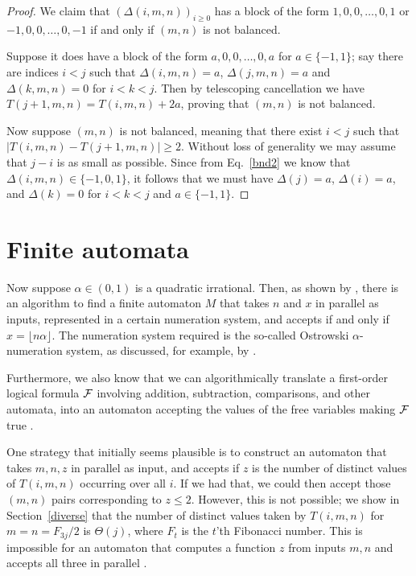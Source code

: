 \documentclass[final]{dmtcs-episciences}
\theoremstyle{plain}
\theoremstyle{remark}
\begin{document}
\begin{proof}
We claim that
$(\Delta(i,m,n))_{i \geq 0}$ has a block of the form $1,0,0,\ldots, 0,1$ or
$-1,0,0,\ldots,0, -1$ if and only if 
$(m,n)$ is not balanced.

Suppose it does have a block of the form $a,0,0,\ldots,0,a$ for $a \in \{ -1, 1\}$; say there are indices
$i < j$ such that
$\Delta(i,m,n) = a$,
$\Delta(j,m,n) = a$ and
$\Delta(k,m,n) = 0$ for $i<k<j$.
Then by telescoping cancellation
we have $T(j+1,m,n)= T(i,m,n) + 2a$, proving that $(m,n)$ is not balanced.

Now suppose $(m,n)$ is not balanced, meaning that there exist $i< j$
such that $|T(i,m,n) - T(j+1,m,n)| \geq 2$.  Without loss of generality we may assume that $j-i$ is as small as possible.
Since from Eq.~\eqref{bnd2} we know that $\Delta(i,m,n) \in \{-1,0,1\}$, it follows that we must have $\Delta(j) = a$,
$\Delta(i) = a$, and
$\Delta(k) = 0$ for $i < k < j$ and
$a \in \{-1,1\}$.
\end{proof}

\section{Finite automata}

Now suppose $\alpha \in (0,1)$ is a quadratic irrational.  Then, as shown by 
\cite{Schaeffer&Shallit&Zorcic:2024},
there is an algorithm to find a finite automaton $M$
that takes $n$ and $x$ in parallel as inputs, represented in a certain numeration system, and
accepts if and only if $x = \lfloor n \alpha \rfloor$.  The numeration system required is the so-called Ostrowski $\alpha$-numeration system, as discussed, for example, by \citet[\S 3.9]{Allouche&Shallit:2003}.

Furthermore, we also know that we can algorithmically translate a first-order logical formula $\cal F$ involving addition, subtraction, comparisons, and other automata, into an automaton accepting the values of the free variables making $\cal F$ true \citep{Bruyere&Hansel&Michaux&Villemaire:1994}.

One strategy that initially seems plausible is to construct an automaton that takes
$m,n,z$ in parallel as input, and accepts if $z$ is the number of distinct values of $T(i,m,n)$ occurring over all $i$.
If we had that, we could then accept those $(m,n)$ pairs corresponding to $z \leq 2$.  However, this is not possible; we show in Section~\ref{diverse} that
the number of distinct values taken by $T(i,m,n)$ for
$m = n = F_{3j}/2$ is $\Theta(j)$, where
$F_t$ is the $t$'th Fibonacci number. This is impossible for an automaton that computes a function $z$ from inputs $m,n$ and accepts all three in parallel \citep{Shallit:2021}.
\end{document}
